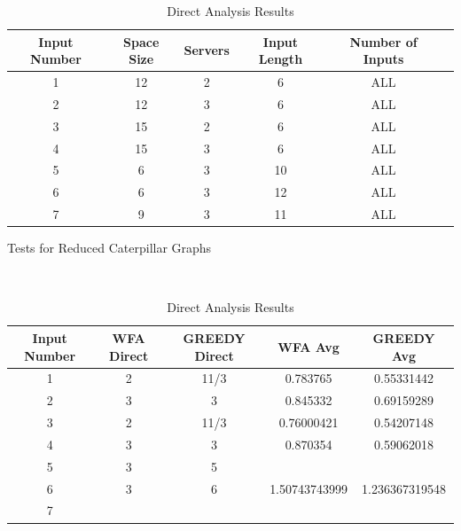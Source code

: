 \begin{table}[!htb]
    \begin{minipage}{.5\linewidth}
      \centering
      \begin{tabular}{|c|c|c|c|c|c|}
        \hline
        Input Number & Space Size & Servers & Input Length & Number of Inputs\\
        \hline
        1 & 12 & 2 & 6 & ALL \\
        \hline
        2 & 12 & 3 & 6 & ALL \\
        \hline
        3 & 15 & 2 & 6 & ALL \\
        \hline
        4 & 15 & 3 & 6 & ALL \\
        \hline
        5 & 6 & 3 & 10 & ALL\\
        \hline
        6 & 6 & 3 & 12 & ALL\\
        \hline
        7 & 9 & 3 & 11 & ALL\\
        \hline
    \end{tabular}
        \caption{Tests for Reduced Caterpillar Graphs}
        \label{tab:tests}
    \end{minipage}%
    \\
    \begin{minipage}{.5\linewidth}
        \centering
        \begin{tabular}{|c|c|c|c|c|}
          \hline
          Input Number & WFA Direct & GREEDY Direct & WFA Avg & GREEDY Avg\\
          \hline
          1 & 2 & 11/3 & 0.783765 & 0.55331442\\
          \hline
          2 & 3 & 3 & 0.845332 & 0.69159289\\
          \hline
          3 & 2 & 11/3 & 0.76000421 & 0.54207148\\
          \hline
          4 & 3 & 3 & 0.870354 & 0.59062018 \\
          \hline
          5 & 3 & 5 &  &  \\
          \hline
          6 & 3 & 6 & 1.50743743999 & 1.236367319548 \\
          \hline
          7 &  &  &  & \\
          \hline

      \end{tabular}
          \caption{Direct Analysis Results}
          \label{tab:results}
    \end{minipage} 
\end{table}